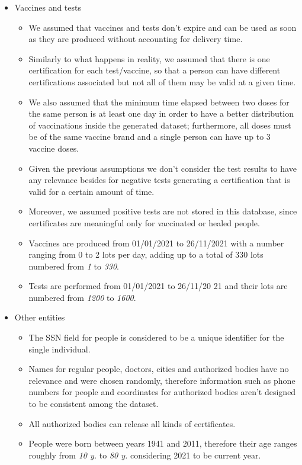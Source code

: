 \documentclass[12pt, a4paper]{article}
\begin{document}
\begin{itemize}

    \item Vaccines and tests
    \begin{itemize}
        \item[] We assumed that vaccines and tests don't expire and can be used 
            as soon as they are produced without accounting for delivery time.
        \item[] Similarly to what happens in reality, we assumed that there is one
            certification for each test/vaccine, so that a person can have different 
            certifications associated but not all of them may be valid at a given time.
        \item[] We also assumed that the minimum time elapsed between two doses
            for the same person is at least one day in order to have a better
            distribution of vaccinations inside the generated dataset;
            furthermore, all doses must be of the same vaccine brand and a
            single person can have up to 3 vaccine doses. 
        \item[] Given the previous assumptions we don't consider the test 
            results to have any relevance besides for negative tests
            generating a certification that is valid for a certain amount of 
            time.        
	\item[] Moreover, we assumed positive tests are not stored in this database, since
	certificates are meaningful only for vaccinated or healed people.
        \item[] Vaccines are produced from 01/01/2021 to 26/11/2021 with a
            number ranging from 0 to 2 lots per day, adding up to a total
            of 330 lots numbered from \emph{1} to \emph{330}.
        \item[] Tests are performed from 01/01/2021 to 26/11/20 21 and 
            their lots are numbered from \emph{1200} to \emph{1600}.
    \end{itemize}

    \item Other entities
    \begin{itemize}
        \item[] The SSN field for people is considered to be a unique
            identifier for the single individual.
        \item[] Names for regular people, doctors, cities and authorized bodies 
            have no relevance and were chosen randomly, therefore information 
            such as phone numbers for people and coordinates for authorized 
            bodies aren't designed to be consistent among the dataset.
        \item[] All authorized bodies can release all kinds of certificates.
        \item[] People were born between years 1941 and 2011, therefore their 
            age ranges roughly from \emph{10 y.} to \emph{80 y.} considering 
            2021 to be current year.
    \end{itemize}

\end{itemize}
  
\end{document}

